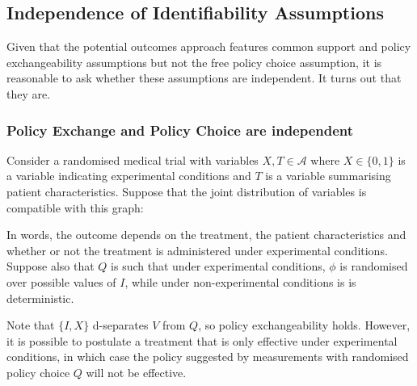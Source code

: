 \subsection{Independence of Identifiability Assumptions}

Given that the potential outcomes approach features common support and policy exchangeability assumptions but not the free policy choice assumption, it is reasonable to ask whether these assumptions are independent. It turns out that they are.

\subsubsection{Policy Exchange and Policy Choice are independent}

Consider a randomised medical trial with variables $X,T\in \mathcal{A}$ where $X\in\{0,1\}$ is a variable indicating experimental conditions and $T$ is a variable summarising patient characteristics. Suppose that the joint distribution of variables is compatible with this graph:

\begin{center}
\end{center}

In words, the outcome depends on the treatment, the patient characteristics and whether or not the treatment is administered under experimental conditions. Suppose also that $Q$ is such that under experimental conditions, $\phi$ is randomised over possible values of $I$, while under non-experimental conditions is is deterministic.

Note that $\{I,X\}$ d-separates $V$ from $Q$, so policy exchangeability holds. However, it is possible to postulate a treatment that is only effective under experimental conditions, in which case the policy suggested by measurements with randomised policy choice $Q$ will not be effective.

